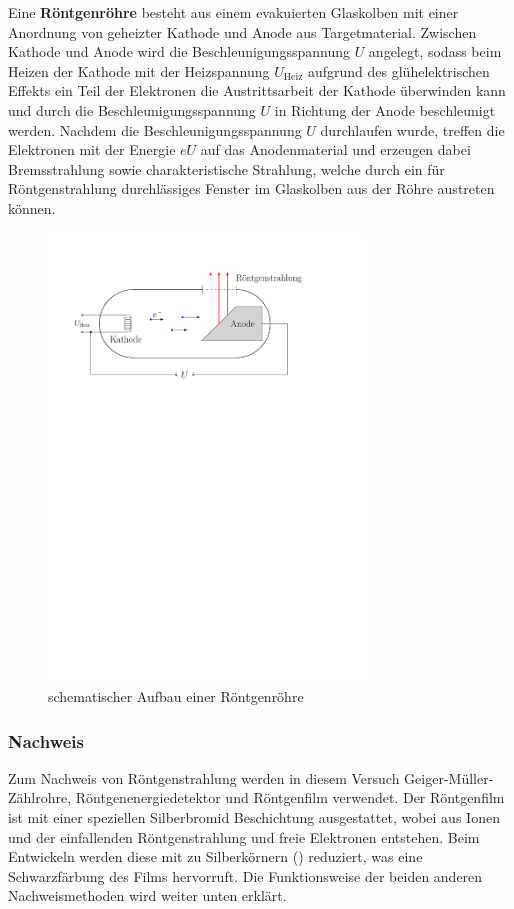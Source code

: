 \documentclass[10pt, a4paper]{article}
\begin{document}
Eine \textbf{Röntgenröhre} besteht aus einem evakuierten Glaskolben mit einer Anordnung von geheizter Kathode und Anode aus Targetmaterial.
Zwischen Kathode und Anode wird die Beschleunigungsspannung $U$ angelegt, sodass beim Heizen der Kathode mit der Heizspannung $U_\mathrm{Heiz}$ aufgrund des glühelektrischen Effekts ein Teil der Elektronen die Austrittsarbeit der Kathode überwinden kann und durch die Beschleunigungsspannung $U$ in Richtung der Anode beschleunigt werden.
Nachdem die Beschleunigungsspannung $U$ durchlaufen wurde, treffen die Elektronen mit der Energie $e U$ auf das Anodenmaterial und erzeugen dabei Bremsstrahlung sowie charakteristische Strahlung, welche durch ein für Röntgenstrahlung durchlässiges Fenster im Glaskolben aus der Röhre austreten können.
\begin{figure}[h]
\centering
\includegraphics[width=0.75\textwidth]{./grafiken/roentgenroehre.pdf}
\caption{schematischer Aufbau einer Röntgenröhre}
\label{fig:roehre}
\end{figure}

\subsubsection{Nachweis}
\label{sec:nachweis}
Zum Nachweis von Röntgenstrahlung werden in diesem Versuch Geiger-Müller-Zählrohre, Röntgenenergiedetektor und Röntgenfilm verwendet.
Der Röntgenfilm ist mit einer speziellen Silberbromid Beschichtung ausgestattet, wobei aus  Ionen und der einfallenden Röntgenstrahlung  und freie Elektronen entstehen.
Beim Entwickeln werden diese mit  zu Silberkörnern () reduziert, was eine Schwarzfärbung des Films hervorruft.
Die Funktionsweise der beiden anderen Nachweismethoden wird weiter unten erklärt.
\end{document}
